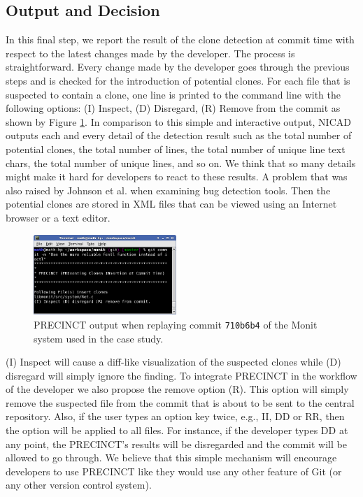\documentclass[conference]{IEEEtran}
\begin{document}
\subsection{Output and Decision}
\label{sub:Output and Decision}

In this final step, we report the result of the clone detection at commit time with respect to the latest changes made by the developer. The process is straightforward. Every change made by the developer goes through the previous steps and is checked for the introduction of potential clones. For each file that is suspected to contain a clone, one line is printed to the command line with the following options: (I) Inspect, (D) Disregard, (R) Remove from the commit as shown by Figure \ref{fig:hook}. In comparison to this simple and interactive output, NICAD outputs each and every detail of the detection result such as the total number of potential clones, the total number of lines, the total number of unique line text chars, the total number of unique lines, and so on. We think that so many details might make it hard for developers to react to these results. A problem that was also raised by Johnson et al. \cite{Johnson2013} when examining bug detection tools.
Then the potential clones are stored in XML files that can be viewed using an Internet browser or a text editor.

\begin{figure}
  \centering
    \includegraphics[width=0.48\textwidth]{media/commit.png}
    \caption{PRECINCT output when replaying commit \texttt{710b6b4} of the Monit system used in the case study.\label{fig:hook}}
\end{figure}

(I) Inspect will cause a diff-like visualization of the suspected clones while (D) disregard will simply ignore the finding.
To integrate PRECINCT in the workflow of the developer we also propose the  remove option (R). This option will simply remove the suspected file from the commit that is about to be sent to the central repository.
Also, if the user types an option key twice, e.g., II, DD or RR, then the option will be applied to all files.
For instance, if the developer types DD at any point, the PRECINCT's results will be disregarded and the commit will be allowed to go through. We believe that this simple mechanism will encourage developers to use PRECINCT like they would use any other feature of Git (or any other version control system).
\end{document}
